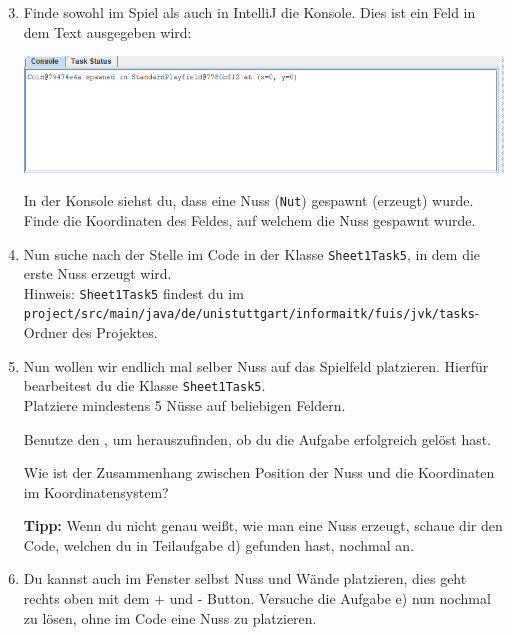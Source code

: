     \begin{enumerate}\setcounter{enumi}{2}

        \item Finde sowohl im Spiel als auch in IntelliJ die Konsole. Dies ist ein Feld in dem Text ausgegeben wird:
        \begin{center}
        \includegraphics[width=\linewidth]{./figures/console.PNG}
        \end{center}
        
        In der Konsole siehst du, dass eine Nuss (\texttt{Nut}) gespawnt (erzeugt) wurde.
        Finde die Koordinaten des Feldes, auf welchem die Nuss gespawnt wurde.
        
        \item Nun suche nach der Stelle im Code in der Klasse \lstinline{Sheet1Task5}, in dem die erste Nuss erzeugt wird.\\
        Hinweis: \lstinline{Sheet1Task5} findest du im \lstinline{project/src/main/java/de/unistuttgart/informaitk/fuis/jvk/tasks}-Ordner des Projektes.
        
        \item Nun wollen wir endlich mal selber Nuss auf das Spielfeld platzieren.
        Hierfür bearbeitest du die Klasse \lstinline{Sheet1Task5}.\\
        Platziere mindestens 5 Nüsse auf beliebigen Feldern.
        
        Benutze den , um herauszufinden, ob du die Aufgabe erfolgreich gelöst hast.
        
        Wie ist der Zusammenhang zwischen Position der Nuss und die Koordinaten im Koordinatensystem?
        
        \textbf{Tipp:} Wenn du nicht genau weißt, wie man eine Nuss erzeugt, schaue dir den Code, welchen du in Teilaufgabe d) gefunden hast, nochmal an.
        \item Du kannst auch im Fenster selbst Nuss und Wände platzieren, dies geht rechts oben mit dem + und - Button. Versuche die Aufgabe e) nun nochmal zu lösen, ohne im Code eine Nuss zu platzieren.
        \end{enumerate}
